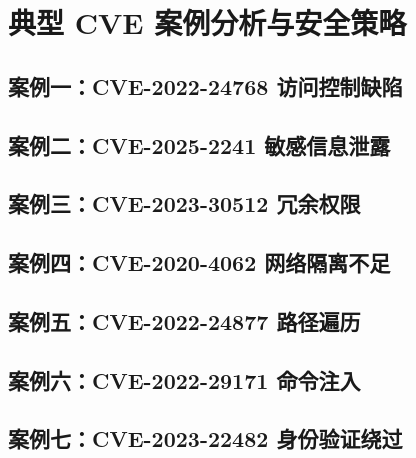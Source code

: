 \section{典型 CVE 案例分析与安全策略}\label{app:case-analysis}

\subsection{案例一：CVE-2022-24768 访问控制缺陷}





\subsection{案例二：CVE-2025-2241 敏感信息泄露}\label{app:cve-2025-2241}




\subsection{案例三：CVE-2023-30512 冗余权限}



\vspace{1em}
\subsection{案例四：CVE-2020-4062 网络隔离不足}




\vspace{1em}
\subsection{案例五：CVE-2022-24877 路径遍历}



\vspace{1em}
\subsection{案例六：CVE-2022-29171 命令注入}


\vspace{1em}
\subsection{案例七：CVE-2023-22482 身份验证绕过}

